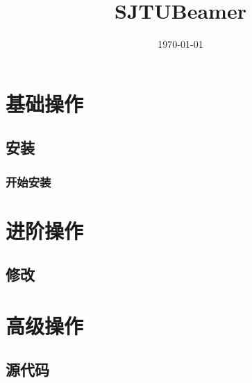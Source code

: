 \documentclass[
    UTF8,
    heading=true,
    scheme=plain
]{ctexrep}
\def\themename{\textsf{SJTUBeamer}}
\begin{document}
    \title{\themename}
    \date{\today}

    \part{基础操作}
    \chapter{安装}

    \section{开始安装}


    \part{进阶操作}
    \chapter{修改}

    \part{高级操作}
    \chapter{源代码}
\end{document}
